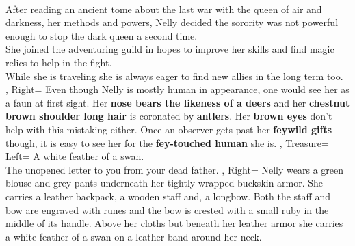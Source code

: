 \documentclass[10pt,a4paper]{scrbook}
\begin{document}
{{{				\\
				After reading an ancient tome about the last war with the queen of air and darkness, her methods and powers, Nelly decided the sorority was not powerful enough to stop the dark queen a second time.\\
				She joined the adventuring guild in hopes to improve her skills and find magic relics to help in the fight.\\
				While she is traveling she is always eager to find new allies in the long term too.\\
			},
			Right={
				Even though Nelly is mostly human in appearance, one would see her as a faun at first sight.
				Her \textbf{nose bears the likeness of a deers} and her \textbf{chestnut brown shoulder long hair} is coronated by \textbf{antlers}.
				Her \textbf{brown eyes} don't help with this mistaking either.
				Once an observer gets past her \textbf{feywild gifts} though, it is easy to see her for the \textbf{fey-touched human} she is.
			}
		},
		Treasure={
			Left={
				A white feather of a swan.\\
				The unopened letter to you from your dead father.
			},
			Right={
				Nelly wears a green blouse and grey pants underneath her tightly wrapped buckskin armor.
				She carries a leather backpack, a wooden staff and, a longbow.
				Both the staff and bow are engraved with runes and the bow is crested with a small ruby in the middle of its handle.
				Above her cloths but beneath her leather armor she carries a white feather of a swan on a leather band around her neck.
			}
		}
	}

\end{document}
